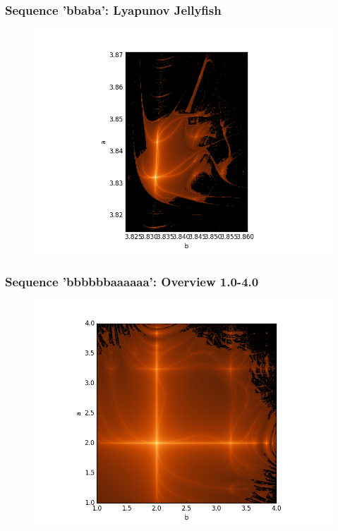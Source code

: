 \documentclass[ignorenonframetext]{beamer}
\begin{document}
\begin{frame}
\frametitle{Sequence 'bbaba': Lyapunov Jellyfish}
\begin{figure}[htbp]
\includegraphics[scale = 0.5]{pictures/bbaba_jellyfish.png}
\end{figure}
\end{frame}

\begin{frame}
\frametitle{Sequence 'bbbbbbaaaaaa': Overview 1.0-4.0}
\begin{figure}[htbp]
\includegraphics[scale = 0.5]{pictures/Overview_bbbbbbaaaaaa.png}
\end{figure}
\end{frame}
\end{document}
